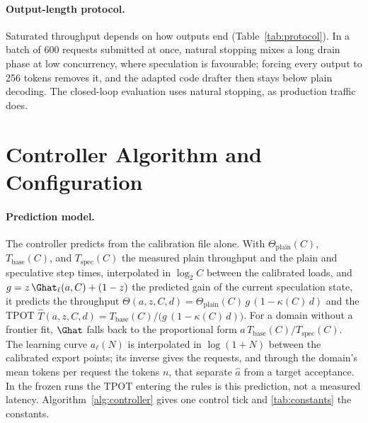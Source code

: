 \paragraph{Output-length protocol.} Saturated throughput depends on how outputs end (Table~\ref{tab:protocol}). In a batch of 600 requests submitted at once, natural stopping mixes a long drain phase at low concurrency, where speculation is favourable; forcing every output to 256 tokens removes it, and the adapted code drafter then stays below plain decoding. The closed-loop evaluation uses natural stopping, as production traffic does.

\begin{table}[!htbp]
\caption{Code domain, Qwen3-8B: speculative over plain throughput for 600 requests submitted at once, with natural stopping versus outputs forced to 256 tokens.}
\label{tab:protocol}
\centering\small

\end{table}

\FloatBarrier
\section{Controller Algorithm and Configuration}\label{app:controller}

\paragraph{Prediction model.} The controller predicts from the calibration file alone. With $\Theta_{\mathrm{plain}}(C)$, $T_{\mathrm{base}}(C)$, and $T_{\mathrm{spec}}(C)$ the measured plain throughput and the plain and speculative step times, interpolated in $\log_2 C$ between the calibrated loads, and $g=z\,\Ghat_\ell(a,C)+(1-z)$ the predicted gain of the current speculation state, it predicts the throughput $\Theta(a,z,C,d)=\Theta_{\mathrm{plain}}(C)\,g\,(1-\kappa(C)\,d)$ and the TPOT $\widehat T(a,z,C,d)=T_{\mathrm{base}}(C)/\big(g\,(1-\kappa(C)\,d)\big)$. For a domain without a frontier fit, $\Ghat$ falls back to the proportional form $a\,T_{\mathrm{base}}(C)/T_{\mathrm{spec}}(C)$. The learning curve $a_\ell(N)$ is interpolated in $\log(1+N)$ between the calibrated export points; its inverse gives the requests, and through the domain's mean tokens per request the tokens $n$, that separate $\hat a$ from a target acceptance. In the frozen runs the TPOT entering the rules is this prediction, not a measured latency. Algorithm~\ref{alg:controller} gives one control tick and \cref{tab:constants} the constants.

